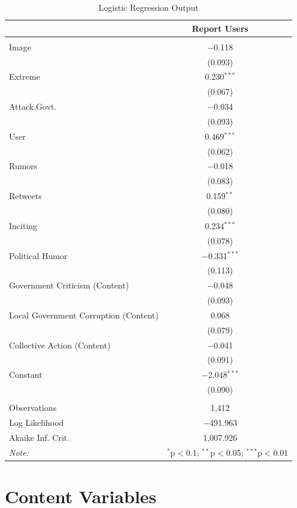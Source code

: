 \documentclass[12pt]{article}
\begin{document}
\begin{CJK*}{UTF8}{gbsn}
\begin{table}[H] \centering 
  \caption{Logistic Regression Output} 
  \label{} 
  \setlength\extrarowheight{-3pt}
\begin{tabular}{@{\extracolsep{2pt}}lcc} 
\\[-1.8ex] & Report Users\\ 
\hline \\[-1.8ex] 
 Image & $-$0.118\\
  & (0.093)\\
 Extreme & 0.230$^{***}$\\
  & (0.067)\\
 Attack.Govt. & $-$0.034\\
  & (0.093)\\
 User & 0.469$^{***}$\\
  & (0.062)\\
 Rumors & $-$0.018\\
  & (0.083)\\
 Retweets & 0.159$^{**}$\\
  & (0.080)\\
 Inciting & 0.234$^{***}$\\
  & (0.078)\\
 Political Humor & $-$0.331$^{***}$\\
  & (0.113)\\
 Government Criticism (Content) & $-$0.048\\
  & (0.093)\\
 Local Government Corruption (Content) & 0.068\\
  & (0.079)\\
 Collective Action (Content) & $-$0.041\\
  & (0.091)\\
 Constant & $-$2.048$^{***}$\\
  & (0.090)\\
\hline \\[-1.8ex] 
Observations & 1,412\\ 
Log Likelihood & $-$491.963\\ 
Akaike Inf. Crit. & 1,007.926\\ 
\hline 
\textit{Note:}  & \multicolumn{2}{r}{$^{*}$p$<$0.1; $^{**}$p$<$0.05; $^{***}$p$<$0.01} \\ 
\end{tabular} 
\end{table}

\section*{Content Variables}



\end{CJK*}
\end{document}
